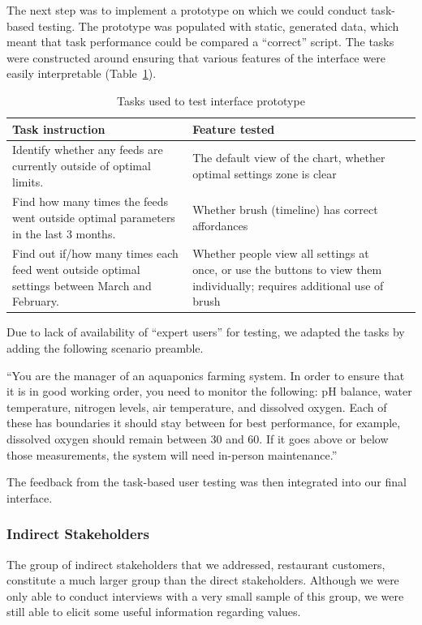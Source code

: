 \documentclass{sigchi}
\newcommand\tabhead[1]{\small\textbf{#1}}
\newcommand{\tasktable}{
\begin{table}
\centering
\begin{tabularx}{0.45\textwidth}{|X|X|X|X|}
    \hline
    \tabhead{Task instruction} & \tabhead{Feature tested} \\
    \hline
    Identify whether any feeds are currently outside of optimal limits. & The default view of the chart, whether optimal settings zone is clear \\
    \hline
    Find how many times the feeds went outside optimal parameters in the last 3 months. & Whether brush (timeline) has correct affordances\\
    \hline
    Find out if/how many times each feed went outside optimal settings between March and February. & Whether people view all settings at once, or use the buttons to view them individually; requires additional use of brush\\
    \hline
\end{tabularx}
  \caption{Tasks used to test interface prototype}
  \label{tab:tasks}
\end{table}
}
\begin{document}
The next step was to implement a prototype on which we could conduct task-based testing. The prototype was populated with static, generated data, which meant that task performance could be compared a ``correct'' script. The tasks were constructed around ensuring that various features of the interface were easily interpretable (Table~\ref{tab:tasks}). 

\tasktable

Due to lack of availability of ``expert users'' for testing, we adapted the tasks by adding the following scenario preamble.

``You are the manager of an aquaponics farming system. In order to ensure that it is in good working order, you need to monitor the following: pH balance, water temperature, nitrogen levels, air temperature, and dissolved oxygen.  Each of these has boundaries it should stay between for best performance, for example, dissolved oxygen should remain between 30 and 60. If it goes above or below those measurements, the system will need in-person maintenance.''

The feedback from the task-based user testing was then integrated into our final interface. 
 
\subsubsection{Indirect Stakeholders}

The group of indirect stakeholders that we addressed, restaurant customers, constitute a much larger group than the direct stakeholders. Although we were only able to conduct interviews with a very small sample of this group, we were still able to elicit some useful information regarding values. 
\end{document}
